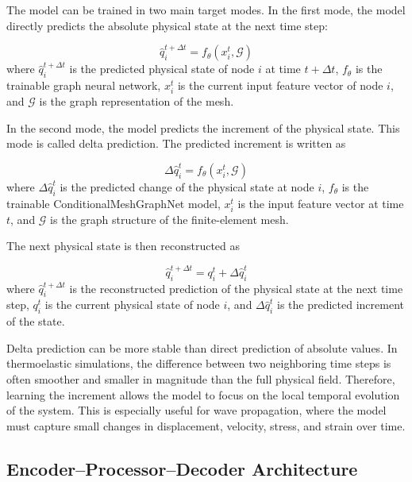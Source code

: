 The model can be trained in two main target modes. In the first mode, the model directly predicts the absolute physical state at the next time step:

\begin{equation}
\hat{q}_i^{t+\Delta t}
=
f_{\theta}
\left(
x_i^t,
\mathcal{G}
\right)
\end{equation}
where \(\hat{q}_i^{t+\Delta t}\) is the predicted physical state of node \(i\) at time \(t+\Delta t\), \(f_{\theta}\) is the trainable graph neural network, \(x_i^t\) is the current input feature vector of node \(i\), and \(\mathcal{G}\) is the graph representation of the mesh.

In the second mode, the model predicts the increment of the physical state. This mode is called delta prediction. The predicted increment is written as

\begin{equation}
\Delta \hat{q}_i^t
=
f_{\theta}
\left(
x_i^t,
\mathcal{G}
\right)
\end{equation}
where \(\Delta \hat{q}_i^t\) is the predicted change of the physical state at node \(i\), \(f_{\theta}\) is the trainable ConditionalMeshGraphNet model, \(x_i^t\) is the input feature vector at time \(t\), and \(\mathcal{G}\) is the graph structure of the finite-element mesh.

The next physical state is then reconstructed as

\begin{equation}
\hat{q}_i^{t+\Delta t}
=
q_i^t
+
\Delta \hat{q}_i^t
\end{equation}
where \(\hat{q}_i^{t+\Delta t}\) is the reconstructed prediction of the physical state at the next time step, \(q_i^t\) is the current physical state of node \(i\), and \(\Delta \hat{q}_i^t\) is the predicted increment of the state.

Delta prediction can be more stable than direct prediction of absolute values. In thermoelastic simulations, the difference between two neighboring time steps is often smoother and smaller in magnitude than the full physical field. Therefore, learning the increment allows the model to focus on the local temporal evolution of the system. This is especially useful for wave propagation, where the model must capture small changes in displacement, velocity, stress, and strain over time.

\subsection{Encoder--Processor--Decoder Architecture}

